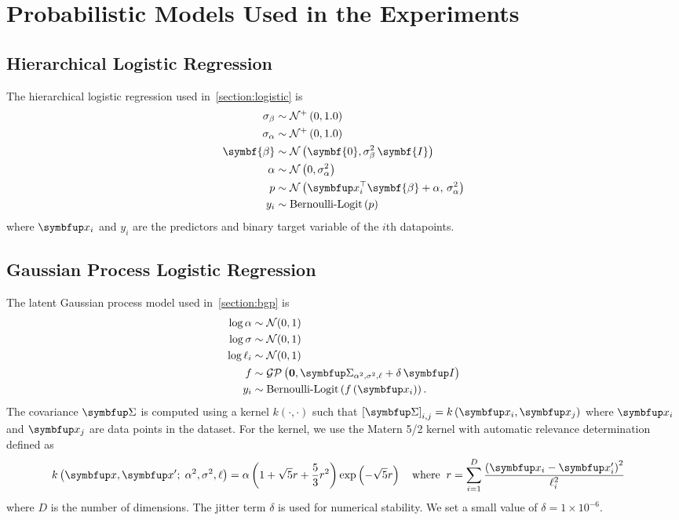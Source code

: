 
\section{Probabilistic Models Used in the Experiments}
\subsection{Hierarchical Logistic Regression}
The hierarchical logistic regression used in~\cref{section:logistic} is 
\begin{align*}
    \sigma_{\beta}  &\sim \mathcal{N}^+\left(0, 1.0\right) \\
    \sigma_{\alpha} &\sim \mathcal{N}^+\left(0, 1.0\right) \\
    \symbf{\beta} &\sim \mathcal{N}\left(\symbf{0}, \sigma_{\beta}^2\,\symbf{I}\right) \\
    \alpha        &\sim \mathcal{N}\left(0, \sigma_{\alpha}^2\right) \\
    p             &\sim \mathcal{N}\left(\vx_i^{\top}\symbf{\beta} + \alpha,\, \sigma_{\alpha}^2\right)\\
    y_i           &\sim \text{Bernoulli-Logit}\,(p)
\end{align*}
where \(\vx_i\) and \(y_i\) are the predictors and binary target variable of the \(i\)th datapoints.

\subsection{Gaussian Process Logistic Regression}
The latent Gaussian process model used in~\cref{section:bgp} is 
\begin{align*}
   \log \alpha &\sim \mathcal{N}(0, 1) \\
   \log \sigma &\sim \mathcal{N}(0, 1) \\
   \log \ell_i &\sim \mathcal{N}(0, 1) \\
   f &\sim \mathcal{GP}\left(\mathbf{0}, \mSigma_{\alpha^2, \sigma^2, \mathbf{\ell}} + \delta\,\mI \right) \\
   y_i &\sim \text{Bernoulli-Logit}\left(  f\left( \vx_i \right) \right).
\end{align*}
The covariance \(\mSigma\) is computed using a kernel \(k\left(\cdot, \cdot\right)\) such that \({[\mSigma]}_{i,j} = k\left( \vx_{i}, \vx_{j} \right) \) where \(\vx_i\) and \(\vx_j\) are data points in the dataset.
For the kernel, we use the Matern 5/2 kernel with automatic relevance determination~\citep{neal_bayesian_1996} defined as
\begin{align*}
  &k\left(\vx, \vx' ;\; \alpha^2, \sigma^2, \mathbf{\ell} \right) =
  \alpha \left( 1 + \sqrt{5} r + \frac{5}{3} r^2 \right) \exp\left( - \sqrt{5} r \right)  \quad
  \text{where}\;\; r = \sum^{D}_{i=1} \frac{ {\left(\vx_i - \vx'_i\right)}^2 }{\ell^2_i}
\end{align*}
where \(D\) is the number of dimensions.
The jitter term \(\delta\) is used for numerical stability.
We set a small value of \(\delta = 1\times10^{-6}\).

